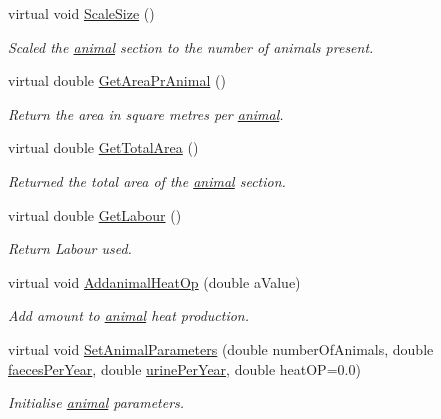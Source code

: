 \begin{DoxyCompactItemize}
virtual void \hyperlink{classanimal_section_a30e3588926513981f209862ca76980cc}{ScaleSize} ()
\begin{DoxyCompactList}\small\item\em Scaled the \hyperlink{classanimal}{animal} section to the number of animals present. \item\end{DoxyCompactList}\item 
virtual double \hyperlink{classanimal_section_acedfd121b961e1b77669efc3104c125d}{GetAreaPrAnimal} ()
\begin{DoxyCompactList}\small\item\em Return the area in square metres per \hyperlink{classanimal}{animal}. \item\end{DoxyCompactList}\item 
virtual double \hyperlink{classanimal_section_a38e74942f2a9a7d767da7d8f209dc7ca}{GetTotalArea} ()
\begin{DoxyCompactList}\small\item\em Returned the total area of the \hyperlink{classanimal}{animal} section. \item\end{DoxyCompactList}\item 
virtual double \hyperlink{classanimal_section_acbe4ee2baee5364b2dbada0196449ebe}{GetLabour} ()
\begin{DoxyCompactList}\small\item\em Return Labour used. \item\end{DoxyCompactList}\item 
virtual void \hyperlink{classanimal_section_a725e52db97d2127b775e259cc21e954e}{AddanimalHeatOp} (double aValue)
\begin{DoxyCompactList}\small\item\em Add amount to \hyperlink{classanimal}{animal} heat production. \item\end{DoxyCompactList}\item 
virtual void \hyperlink{classanimal_section_a8266d11321ed09220ff65d4b2f765714}{SetAnimalParameters} (double numberOfAnimals, double \hyperlink{classanimal_section_ab764a9e7261c89469543c202df1aff2a}{faecesPerYear}, double \hyperlink{classanimal_section_ae3f2a70dd57961b9b98842622b6ebcd2}{urinePerYear}, double heatOP=0.0)
\begin{DoxyCompactList}\small\item\em Initialise \hyperlink{classanimal}{animal} parameters. \item\end{DoxyCompactList}\end{DoxyCompactItemize}
